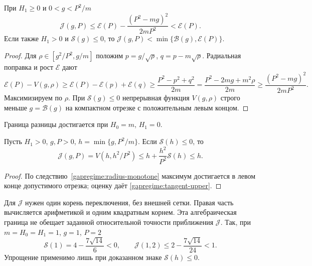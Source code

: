 \begin{corollary}
\label{joint:strict}
При $H_1\ge0$ и $0<g<P^2/m$
\[
 \mathcal J(g,P)\le\mathcal E(P)
   -\frac{(P^2-mg)^2}{2mP^2}<\mathcal E(P).
\]
Если также $H_1>0$ и $\mathcal S(g)\le0$, то
$\mathcal J(g,P)<\min\{\mathcal B(g),\mathcal E(P)\}$.
\end{corollary}
\begin{proof}
Для $\rho\in[g^2/P^2,g/m]$ положим
$p=g/\sqrt\rho$, $q=p-m\sqrt\rho$.
Радиальная поправка и рост $\mathcal E$ дают
\[
 \mathcal E(P)-V(g,\rho)
 \ge\mathcal E(P)-\mathcal E(p)+\mathcal E(q)
 \ge\frac{P^2-p^2+q^2}{2m}
 =\frac{P^2-2mg+m^2\rho}{2m}
 \ge\frac{(P^2-mg)^2}{2mP^2}.
\]
Максимизируем по $\rho$. При $\mathcal S(g)\le0$ непрерывная
функция $V(g,\rho)$ строго меньше $g=\mathcal B(g)$ на компактном
отрезке с положительным левым концом.
\end{proof}
Граница разницы достигается при $H_0=m$, $H_1=0$.

\begin{corollary}
\label{joint:ordinary}\label{joint:regime}
Пусть $H_1>0$, $g,P>0$, $h=\min\{g,P^2/m\}$.
Если $\mathcal S(h)\le0$, то
\begin{equation}\label{joint:ordinary-formula}
 \mathcal J(g,P)=V(h,h^2/P^2)
 \le h+\frac{h^2}{P^2}\mathcal S(h)\le h.
\end{equation}
\end{corollary}
\begin{proof}
По следствию~\ref{gapregime:radius-monotone} максимум достигается
в левом конце допустимого отрезка; оценку даёт
\eqref{gapregime:tangent-upper}.
\end{proof}
Для $\mathcal J$ нужен один корень переключения, без внешней сетки.
Правая часть вычисляется арифметикой и одним квадратным корнем.
Эта алгебраическая граница не обещает заданной относительной
точности приближения $\mathcal J$.
Так, при $m=H_0=H_1=1$, $g=1$, $P=2$
\[
 \mathcal S(1)=4-\frac{7\sqrt{14}}6<0,\qquad
 \mathcal J(1,2)\le2-\frac{7\sqrt{14}}{24}<1.
\]
Упрощение применимо лишь при доказанном знаке $\mathcal S(h)\le0$.

